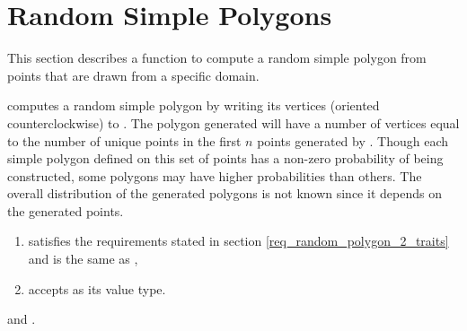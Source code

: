 
\newpage

\ccParDims

\section{Random Simple Polygons}
\label{sec:random_simple_polygons}

This section describes a function to compute a random simple polygon
from points that are drawn from a specific domain.



{
computes a random simple polygon by writing its vertices (oriented
counterclockwise) to . The polygon generated will have a number
of vertices equal to the number of unique points in the first $n$ points
generated by . Though each simple polygon defined on this set of 
points has a non-zero probability of being constructed, some polygons may 
have higher probabilities than others.  The overall distribution of the
generated polygons is not known since it depends on the generated points.
}

\begin{enumerate}
\item {} satisfies the requirements stated in
      section \ref{req_random_polygon_2_traits} and  
      is the same as ,
\item {} accepts  as its
      value type.
\end{enumerate}


\ccSeeAlso {} and
.

